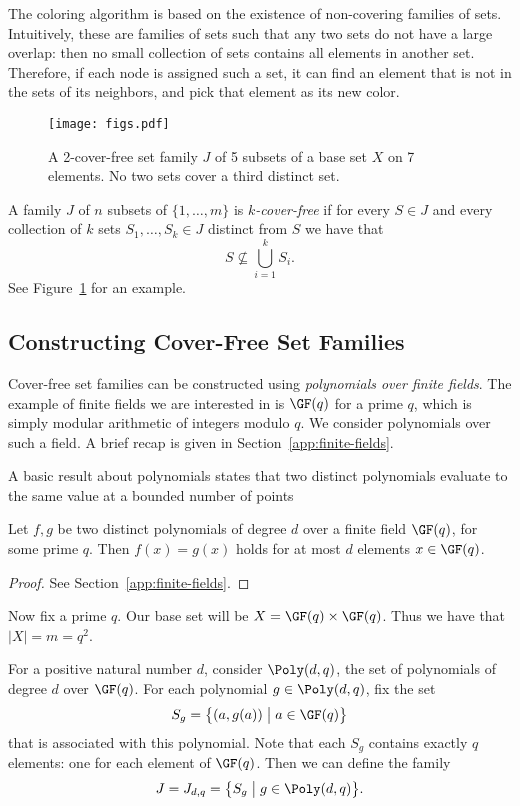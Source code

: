 The coloring algorithm is based on the existence of non-covering families of sets. Intuitively, these are families of sets such that any two sets do not have a large overlap: then no small collection of sets contains all elements in another set. Therefore, if each node is assigned such a set, it can find an element that is not in the sets of its neighbors, and pick that element as its new color.

\begin{figure}
  \centering
  \texttt{[image: figs.pdf]}
  \caption{A 2-cover-free set family $J$ of 5 subsets of a base set $X$ on 7 elements. No two sets cover a third distinct set.}\label{fig:cover-free-sets}
\end{figure}

A family $J$ of $n$ subsets of $\{1, \dots, m \}$ is \emph{$k$-cover-free} if for every $S \in J$ and every collection of $k$ sets $S_1, \dots, S_k \in J$ distinct from $S$ we have that
\[
  S \nsubseteq \bigcup_{i=1}^{k} S_i.
\]
See Figure~\ref{fig:cover-free-sets} for an example.

\subsection{Constructing Cover-Free Set Families}

Cover-free set families can be constructed using \emph{polynomials over finite fields}. The example of finite fields we are interested in is $\GF(q)$ for a prime $q$, which is simply modular arithmetic of integers modulo $q$. We consider polynomials over such a field. A brief recap is given in Section~\ref{app:finite-fields}.

A basic result about polynomials states that two distinct polynomials evaluate to the same value at a bounded number of points

\begin{lemma} \label{lem:poly-roots}
  Let $f,g$ be two distinct polynomials of degree $d$ over a finite field $\GF(q)$, for some prime $q$. Then $f(x) = g(x)$ holds for at most $d$ elements $x \in \GF(q)$.
\end{lemma}
\begin{proof}
See Section~\ref{app:finite-fields}.
\end{proof}

Now fix a prime $q$. Our base set will be $X = \GF(q) \times \GF(q)$. Thus we have that $|X| = m = q^2$.

For a positive natural number $d$, consider $\Poly(d,q)$, the set of polynomials of degree $d$ over $\GF(q)$. For each polynomial $g \in \Poly(d,q)$, fix the set \[S_g = \bigl\{ (a, g(a)) \bigm| a \in \GF(q) \bigr\}\] that is associated with this polynomial. Note that each $S_g$ contains exactly $q$ elements: one for each element of $\GF(q)$. Then we can define the family \[J = J_{d,q} = \bigl\{ S_g \bigm| g \in \Poly(d,q) \bigr\}.\]

